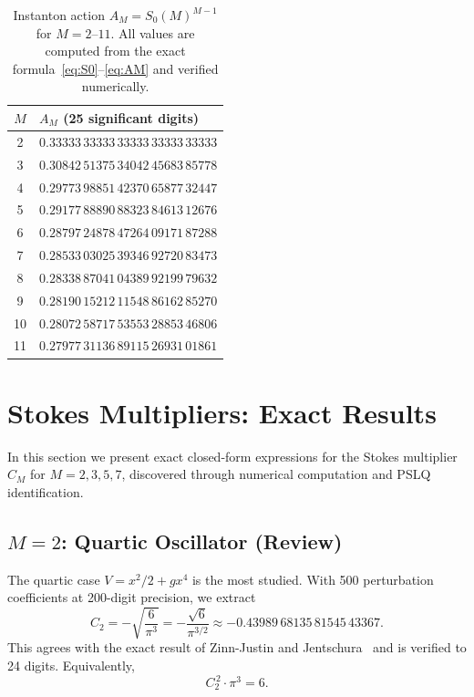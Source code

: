 \documentclass[12pt,a4paper]{article}
\numberwithin{equation}{section}
\theoremstyle{plain}
\theoremstyle{definition}
\theoremstyle{remark}
\begin{document}
\begin{table}[ht]
\centering
\caption{Instanton action $A_M = S_0(M)^{M-1}$ for $M = 2$--$11$.
All values are computed from the exact formula~\eqref{eq:S0}--\eqref{eq:AM}
and verified numerically.}
\label{tab:AM}
\begin{tabular}{@{}cl@{}}
\toprule
$M$ & $A_M$ (25 significant digits) \\
\midrule
 2 & $0.33333\,33333\,33333\,33333\,33333$ \\
 3 & $0.30842\,51375\,34042\,45683\,85778$ \\
 4 & $0.29773\,98851\,42370\,65877\,32447$ \\
 5 & $0.29177\,88890\,88323\,84613\,12676$ \\
 6 & $0.28797\,24878\,47264\,09171\,87288$ \\
 7 & $0.28533\,03025\,39346\,92720\,83473$ \\
 8 & $0.28338\,87041\,04389\,92199\,79632$ \\
 9 & $0.28190\,15212\,11548\,86162\,85270$ \\
10 & $0.28072\,58717\,53553\,28853\,46806$ \\
11 & $0.27977\,31136\,89115\,26931\,01861$ \\
\bottomrule
\end{tabular}
\end{table}

\section{Stokes Multipliers: Exact Results}
\label{sec:exact}

In this section we present exact closed-form expressions for the Stokes
multiplier $C_M$ for $M = 2, 3, 5, 7$, discovered through numerical
computation and PSLQ identification.

\subsection{$M = 2$: Quartic Oscillator (Review)}
\label{sec:M2}

The quartic case $V = x^2/2 + gx^4$ is the most studied. With 500
perturbation coefficients at 200-digit precision, we extract
\begin{equation}\label{eq:C2-value}
  C_2 = -\sqrt{\frac{6}{\pi^3}} = -\frac{\sqrt{6}}{\pi^{3/2}}
  \approx -0.43989\,68135\,81545\,43367.
\end{equation}
This agrees with the exact result of Zinn-Justin and
Jentschura~\cite{ZJJ2004} and is verified to 24 digits.
Equivalently,
\begin{equation}\label{eq:C2-closed}
  C_2^{\,2} \cdot \pi^3 = 6.
\end{equation}
\end{document}
